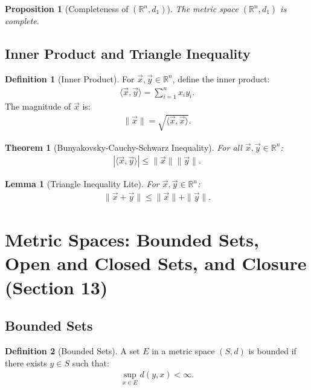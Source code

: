 \documentclass[9pt]{article}
\theoremstyle{definition}
\newtheorem{definition}{Definition}
\theoremstyle{plain}
\newtheorem{theorem}{Theorem}
\newtheorem{proposition}{Proposition}
\newtheorem{lemma}{Lemma}
\begin{document}
\begin{proposition}[Completeness of $ (\mathbb{R}^n, d_1) $]
The metric space $ (\mathbb{R}^n, d_1) $ is complete.
\end{proposition}

\subsection*{Inner Product and Triangle Inequality}
\begin{definition}[Inner Product]
For $ \vec{x}, \vec{y} \in \mathbb{R}^n $, define the inner product:
\begin{align}
\langle \vec{x}, \vec{y} \rangle = \sum_{i=1}^n x_i y_i.
\end{align}
The magnitude of $ \vec{x} $ is:
\begin{align}
\|\vec{x}\| = \sqrt{\langle \vec{x}, \vec{x} \rangle}.
\end{align}
\end{definition}

\begin{theorem}[Bunyakovsky-Cauchy-Schwarz Inequality]
For all $ \vec{x}, \vec{y} \in \mathbb{R}^n $:
\begin{align}
|\langle \vec{x}, \vec{y} \rangle| \leq \|\vec{x}\| \|\vec{y}\|.
\end{align}
\end{theorem}

\begin{lemma}[Triangle Inequality Lite]
For $ \vec{x}, \vec{y} \in \mathbb{R}^n $:
\begin{align}
\|\vec{x} + \vec{y}\| \leq \|\vec{x}\| + \|\vec{y}\|.
\end{align}
\end{lemma}
\section*{Metric Spaces: Bounded Sets, Open and Closed Sets, and Closure (Section 13)}

\subsection*{Bounded Sets}
\begin{definition}[Bounded Sets]
A set $ E $ in a metric space $ (S, d) $ is bounded if there exists $ y \in S $ such that:
\begin{align}
\sup_{x \in E} d(y, x) < \infty.
\end{align}
\end{definition}
\end{document}
